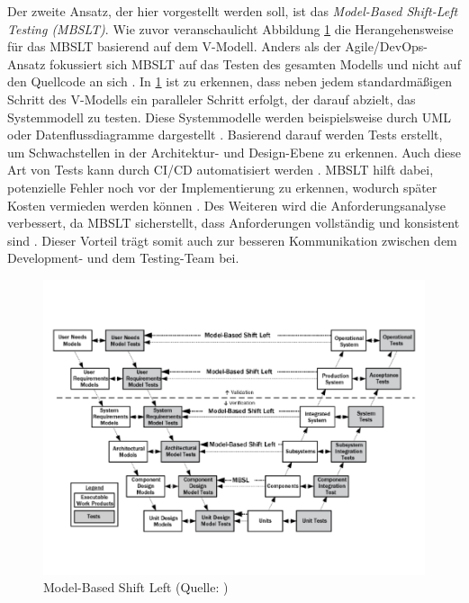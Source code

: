 Der zweite Ansatz, der hier vorgestellt werden soll, ist das \textit{Model-Based Shift-Left Testing (MBSLT)}. Wie zuvor veranschaulicht Abbildung \ref{fig:modelbased} die Herangehensweise für das MBSLT basierend auf dem V-Modell. Anders als der Agile/DevOps-Ansatz fokussiert sich MBSLT auf das Testen des gesamten Modells und nicht auf den Quellcode an sich \cite{rani_shift-left_2023}. In \ref{fig:modelbased} ist zu erkennen, dass neben jedem standardmäßigen Schritt des V-Modells ein paralleler Schritt erfolgt, der darauf abzielt, das Systemmodell zu testen. Diese Systemmodelle werden beispielsweise durch UML oder Datenflussdiagramme dargestellt \cite{rani_shift-left_2023}. Basierend darauf werden Tests erstellt, um Schwachstellen in der Architektur- und Design-Ebene zu erkennen. Auch diese Art von Tests kann durch CI/CD automatisiert werden \cite{rani_shift-left_2023}. MBSLT hilft dabei, potenzielle Fehler noch vor der Implementierung zu erkennen, wodurch später Kosten vermieden werden können \cite{rani_shift-left_2023}. Des Weiteren wird die Anforderungsanalyse verbessert, da MBSLT sicherstellt, dass Anforderungen vollständig und konsistent sind \cite{rani_shift-left_2023}. Dieser Vorteil trägt somit auch zur besseren Kommunikation zwischen dem Development- und dem Testing-Team bei.

\begin{figure}
    \centering
    \includegraphics[width=0.9\linewidth]{images/Model_Based_Shift_Left.png}
    \caption{Model-Based Shift Left (Quelle: )}
    \label{fig:modelbased}
\end{figure}

